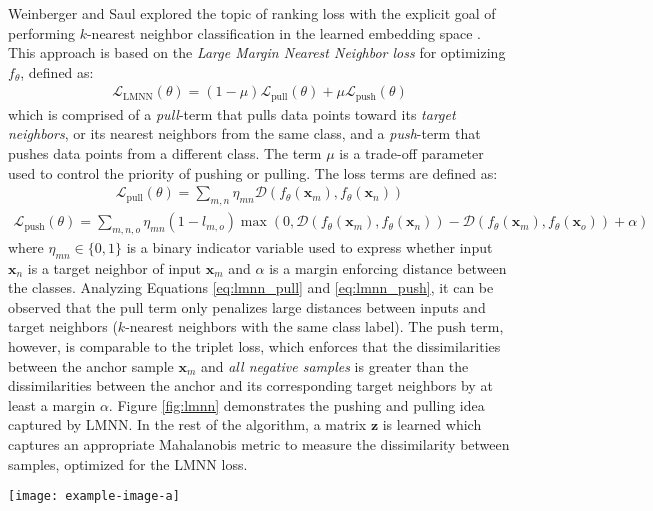 		Weinberger and Saul \citep{Weinberger2009LMNN} explored the topic of ranking loss with the explicit goal of performing $k$-nearest neighbor classification in the learned embedding space \citep{Hermans2017DefenseTripletLoss}.  This approach is based on the \textit{Large Margin Nearest Neighbor loss} for optimizing $f_{\theta}$, defined as:
		\begin{align}
			\mathcal{L}_{\text{LMNN}}(\theta) = (1-\mu)\mathcal{L}_{\text{pull}}(\theta) + \mu \mathcal{L}_{\text{push}}(\theta)
		\end{align}
		\noindent
		which is comprised of a \textit{pull}-term that pulls data points toward its \textit{target neighbors}, or its nearest neighbors from the same class, and a \textit{push}-term that pushes data points from a different class.  The term $\mu$ is a trade-off parameter used to control the priority of pushing or pulling. The loss terms are defined as:
		\begin{align} \label{eq:lmnn_pull}
			\mathcal{L}_{\text{pull}}(\theta) =  \sum_{m,n}\eta_{mn} \mathcal{D}(f_{\theta}(\bm{x}_{m}),f_{\theta}(\bm{x}_{n}))
		\end{align}
		\begin{align} \label{eq:lmnn_push}
		\mathcal{L}_{\text{push}}(\theta) = \sum_{m,n,o}\eta_{mn}(1-l_{m,o}) \max(0,\mathcal{D}(f_{\theta}(\bm{x}_{m}),f_{\theta}(\bm{x}_{n})) - \mathcal{D}(f_{\theta}(\bm{x}_{m}),f_{\theta}(\bm{x}_{o})) + \alpha )
		\end{align}
		\noindent
		where  $\eta_{mn} \in \{0,1\}$ is a binary indicator variable used to express whether input $\bm{x}_{n}$ is a target neighbor of input $\bm{x}_{m}$ and $\alpha$ is a margin enforcing distance between the classes.  Analyzing Equations \ref{eq:lmnn_pull} and \ref{eq:lmnn_push}, it can be observed that the pull term only penalizes large distances between inputs and target neighbors ($k$-nearest neighbors with the same class label).  The push term, however, is comparable to the triplet loss, which enforces that the dissimilarities between the anchor sample $\bm{x}_{m}$ and \textit{all negative samples} is greater than the dissimilarities between the anchor and its corresponding target neighbors by at least a margin $\alpha$.  Figure \ref{fig:lmnn} demonstrates the pushing and pulling idea captured by LMNN.  In the rest of the algorithm, a matrix $\bm{z}$ is learned which captures an appropriate Mahalanobis metric to measure the dissimilarity between samples, optimized for the LMNN loss.  
		
		
		\begin{center}
			\begin{figure*}[h]
				\centering
				\texttt{[image: example-image-a]}
				\caption[Large Margin $k$-NN]{}
				\label{fig:lmnn}
			\end{figure*}
		\end{center}
		
